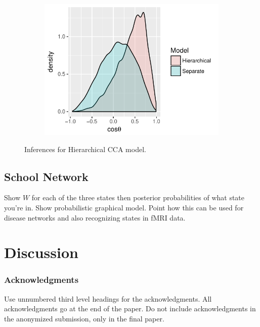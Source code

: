 \documentclass{article}
\begin{document}
\begin{figure}
    \begin{subfigure}[b]{0.3\textwidth}
        \includegraphics[width=\textwidth]{posteriorCosAngle.pdf}
        \caption{}
        \label{fig:posteriorCosAngle}
    \end{subfigure}
    \caption{Inferences for Hierarchical CCA model.}\label{fig:ccaResults}
\end{figure}

\subsection{School Network}

Show $W$ for each of the three states then posterior probabilities of what state you're in. Show probabilistic graphical model. Point how this can be used for disease networks and also recognizing states in fMRI data.

\section{Discussion}

\subsubsection*{Acknowledgments}

Use unnumbered third level headings for the acknowledgments. All
acknowledgments go at the end of the paper. Do not include
acknowledgments in the anonymized submission, only in the final paper.

\end{document}
